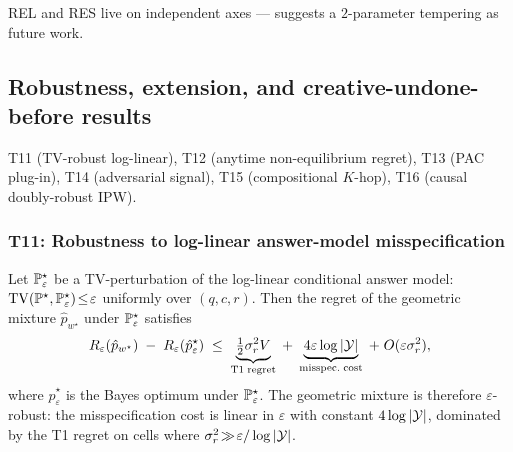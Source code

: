 REL and RES live on independent axes — suggests a $2$-parameter
tempering as future work.

\subsection{Robustness, extension, and creative-undone-before results}
\label{app:robustness-extension}

T11 (TV-robust log-linear), T12 (anytime non-equilibrium regret),
T13 (PAC plug-in), T14 (adversarial signal), T15 (compositional
$K$-hop), T16 (causal doubly-robust IPW).

\subsubsection{T11: Robustness to log-linear answer-model misspecification}
\label{app:t11-robustness-loglin}

\begin{theorem}
\label{thm:t11-robust-loglin}
Let $\mathbb{P}^\star_\varepsilon$ be a TV-perturbation of the log-linear
conditional answer model: $\operatorname{TV}(\mathbb{P}^\star,\mathbb{P}^\star_\varepsilon)\!\le\!\varepsilon$
uniformly over $(q,c,r)$.  Then the regret of the geometric
mixture $\hat p_{w^\star}$ under $\mathbb{P}^\star_\varepsilon$ satisfies
\[
R_\varepsilon(\hat p_{w^\star})\;-\;R_\varepsilon(\hat p^\star_\varepsilon)
\;\le\;
\underbrace{\tfrac12\sigma_r^{2}V}_{\mathrm{T1\;regret}}
\;+\;
\underbrace{4\varepsilon\log|\mathcal{Y}|}_{\mathrm{misspec.\;cost}}
\;+\;O(\varepsilon\sigma_r^{2}),
\]
where $\hat p^\star_\varepsilon$ is the Bayes optimum under
$\mathbb{P}^\star_\varepsilon$.  The geometric mixture is therefore
$\varepsilon$-robust: the misspecification cost is linear in
$\varepsilon$ with constant $4\log|\mathcal{Y}|$, dominated by the T1
regret on cells where $\sigma_r^{2}\!\gg\!\varepsilon/\log|\mathcal{Y}|$.
\end{theorem}

